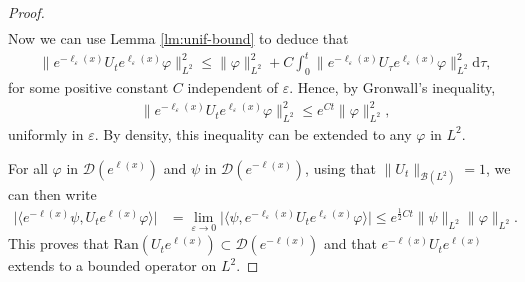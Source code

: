 \documentclass[12pt]{article}
\theoremstyle{plain}
\begin{document}
\begin{proof}
\begin{align}
\end{align}
Now we can use Lemma \ref{lm:unif-bound} to deduce that
\begin{align*}
    &\big\|e^{-\ell_\varepsilon(x)}U_te^{\ell_\varepsilon(x)}\varphi\big\|_{L^2}^2
    \le\|\varphi\|_{L^2}^2+C\int_0^t\big\| e^{-\ell_\varepsilon(x)}U_\tau e^{\ell_\varepsilon(x)}\varphi\big\|_{L^2}^2\mathrm{d}\tau,
\end{align*}
for some positive constant $C$ independent of $\varepsilon$. Hence, by Gronwall's inequality,
\begin{align}\label{eq:Gronwall-eps}
    &\big\|e^{-\ell_\varepsilon(x)}U_te^{\ell_\varepsilon(x)}\varphi\big\|_{L^2}^2
    \le e^{Ct}\|\varphi\|_{L^2}^2,
\end{align}
uniformly in $\varepsilon$. By density, this inequality can be extended to any $\varphi$ in $L^2$.

For all $\varphi$ in $\mathcal{D}(e^{\ell(x)})$ and $\psi$ in $\mathcal{D}(e^{-\ell(x)})$, using that $\|U_t\|_{\mathcal{B}(L^2)}=1$, we can then write
	    \begin{align*}
	        \big|\langle e^{-\ell(x)}\psi , U_te^{\ell(x)}\varphi\rangle\big|
	        &=\lim_{\varepsilon\to0}\big|\langle \psi , e^{-\ell_\varepsilon(x)}U_te^{\ell_\varepsilon(x)}\varphi\rangle\big|
	        \le e^{\frac12Ct}\|\psi\|_{L^2}\|\varphi\|_{L^2}.
	   \end{align*}
This proves that $\mathrm{Ran}(U_te^{\ell(x)})\subset\mathcal{D}(e^{-\ell(x)})$ and that $e^{-\ell(x)}U_te^{\ell(x)}$ extends to a bounded operator on $L^2$.


\end{proof}
\end{document}
